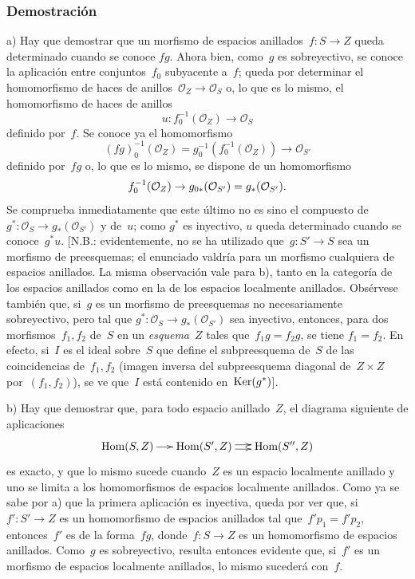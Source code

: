 \subsubsection*{Demostración} a) Hay que demostrar que un morfismo de
espacios anillados~$f\colon S\to Z$ queda determinado cuando se conoce
$fg$. Ahora bien, como~$g$ es sobreyectivo, se conoce la aplicación entre
conjuntos~$f_{0}$ subyacente a~$f$; queda por determinar el homomorfismo
de haces de anillos~$\mathcal{O}_{Z}\to \mathcal{O}_{S}$ o, lo que es lo
mismo, el homomorfismo
de haces de anillos
$$
u\colon f_{0}^{-1}(\mathcal{O}_{Z})\to \mathcal{O}_{S}
$$
definido por~$f$. Se conoce ya el homomorfismo
$$
(fg)_{0}^{-1}(\mathcal{O}_{Z})=
g_{0}^{-1}(f_{0}^{-1}(\mathcal{O}_{Z}))\to \mathcal{O}_{S'}
$$
definido por~$fg$ o, lo que es lo mismo, se dispone de un homomorfismo
$$
f_{0}^{-1}(\mathcal{O}_{Z})\to
g_{0*}(\mathcal{O}_{S'})=g_*(\mathcal{O}_{S'}).
$$
Se comprueba inmediatamente que este último no es sino el compuesto de
$g^*\colon \mathcal{O}_{S}\to g_*(\mathcal{O}_{S'})$ y de~$u$; como
$g^*$ es inyectivo, $u$ queda determinado cuando se conoce~$g^*u$.
[N.B.: evidentemente, no se ha utilizado que~$g\colon S'\to S$ sea un
morfismo de preesquemas; el enunciado valdría para un morfismo cualquiera
de espacios anillados. La misma observación vale para b), tanto en la
categoría de los espacios anillados como en la de los espacios localmente
anillados. Obsérvese también que, si~$g$ es un morfismo de
preesquemas no necesariamente sobreyectivo, pero tal que
$g^*\colon \mathcal{O}_{S}\to g_*(\mathcal{O}_{S'})$ sea inyectivo,
entonces, para dos morfismos~$f_{1},f_{2}$ de~$S$ en un
\emph{esquema}~$Z$ tales que~$f_{1}g=f_{2}g$, se tiene $f_{1}=f_{2}$. En
efecto, si~$I$ es el ideal sobre~$S$ que define el subpreesquema de~$S$ de
las coincidencias de~$f_{1},f_{2}$ (imagen inversa del subpreesquema
diagonal de~$Z\times Z$ por~$(f_{1},f_{2})$), se ve que~$I$ está contenido
en~$\operatorname{Ker}(g^*)$].

b) Hay que demostrar que, para todo espacio anillado~$Z$, el diagrama
siguiente de aplicaciones
$$
\xymatrix@C=.5cm{\Hom(S,Z)\ar[r] & \Hom(S',Z)\ar@/^2pt/[r]\ar@/_2pt/[r] &
\Hom(S'',Z)}
$$
es exacto, y que lo mismo sucede cuando~$Z$ es un espacio localmente
anillado y uno se limita a los homomorfismos de espacios localmente
anillados. Como ya se sabe por a) que la primera aplicación es
inyectiva, queda por ver que, si~$f'\colon S'\to Z$ es un homomorfismo de
espacios anillados tal que~$f'p_{1}=f'p_{2}$,
entonces~$f'$ es de la forma~$fg$, donde~$f\colon S\to Z$ es un
homomorfismo de espacios anillados. Como~$g$ es sobreyectivo, resulta
entonces evidente que, si~$f'$ es un morfismo de espacios localmente
anillados, lo mismo sucederá con~$f$.

